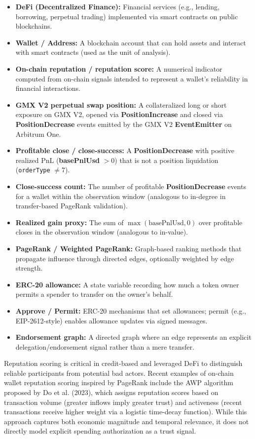 \begin{itemize}
\item[\textbullet] \textbf{DeFi (Decentralized Finance): }Financial services (e.g., lending, borrowing, perpetual trading) implemented via smart contracts on public blockchains.
\item[\textbullet] \textbf{Wallet / Address: }A blockchain account that can hold assets and interact with smart contracts (used as the unit of analysis).
\item[\textbullet] \textbf{On-chain reputation / reputation score: }A numerical indicator computed from on-chain signals intended to represent a wallet's reliability in financial interactions.
\item[\textbullet] \textbf{GMX V2 perpetual swap position: }A collateralized long or short exposure on GMX V2, opened via \textbf{PositionIncrease} and closed via \textbf{PositionDecrease} events emitted by the GMX V2 \textbf{EventEmitter} on Arbitrum One.
\item[\textbullet] \textbf{Profitable close / close-success: }A \textbf{PositionDecrease} with positive realized PnL (\textbf{basePnlUsd} $> 0$) that is not a position liquidation (\texttt{orderType} $\neq 7$).
\item[\textbullet] \textbf{Close-success count: }The number of profitable \textbf{PositionDecrease} events for a wallet within the observation window (analogous to in-degree in transfer-based PageRank validation).
\item[\textbullet] \textbf{Realized gain proxy: }The sum of $\max(\text{basePnlUsd}, 0)$ over profitable closes in the observation window (analogous to in-value).
\item[\textbullet] \textbf{PageRank / Weighted PageRank: }Graph-based ranking methods that propagate influence through directed edges, optionally weighted by edge strength.
\item[\textbullet] \textbf{ERC-20 allowance: }A state variable recording how much a token owner permits a spender to transfer on the owner's behalf.
\item[\textbullet] \textbf{Approve / Permit: }ERC-20 mechanisms that set allowances; permit (e.g., EIP-2612-style) enables allowance updates via signed messages.
\item[\textbullet] \textbf{Endorsement graph: }A directed graph where an edge represents an explicit delegation/endorsement signal rather than a mere transfer.
\end{itemize}
Reputation scoring is critical in credit-based and leveraged DeFi to distinguish reliable participants from potential bad actors. Recent examples of on-chain wallet reputation scoring inspired by PageRank include the AWP algorithm proposed by Do et al. (2023), which assigns reputation scores based on transaction volume (greater inflows imply greater trust) and activeness (recent transactions receive higher weight via a logistic time-decay function). While this approach captures both economic magnitude and temporal relevance, it does not directly model explicit spending authorization as a trust signal.


